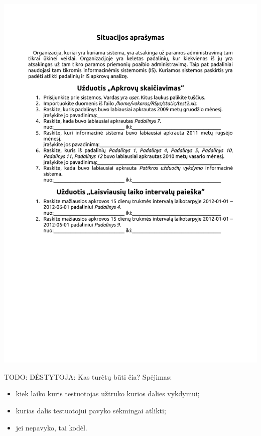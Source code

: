 \hspace{-4.0cm}\includegraphics[scale=1.00]{./4/pdfs/task.pdf}

\newpage
{}

TODO: DĖSTYTOJA: Kas turėtų būti čia? Spėjimas:
\begin{itemize}
  \item kiek laiko kuris testuotojas užtruko kurios dalies vykdymui;
  \item kurias dalis testuotojui pavyko sėkmingai atlikti;
  \item jei nepavyko, tai kodėl.
\end{itemize}
